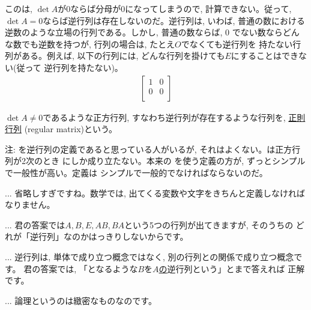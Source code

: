 このは, $\det A$が0ならば分母が0になってしまうので, 
計算できない。従って, $\det A=0$ならば逆行列は存在しないのだ。逆行列は, いわば, 
普通の数における逆数のような立場の行列である。しかし, 普通の数ならば, 0
でない数ならどんな数でも逆数を持つが, 行列の場合は, たとえ$O$でなくても逆行列を
持たない行列がある。例えば, 以下の行列には, どんな行列を掛けても$E$にすることはできない(従って
逆行列を持たない)。
\begin{eqnarray} \begin{bmatrix}
1 & 0 \\
0 & 0 \\
\end{bmatrix}\end{eqnarray}

$\det A \neq 0$であるような正方行列, すなわち逆行列が存在するような行列を, 
\underline{正則行列}  (regular matrix)という。

注: を逆行列の定義であると思っている人がいるが, 
それはよくない。は正方行列が2次のとき
にしか成り立たない。本来の
を使う定義の方が, ずっとシンプルで一般性が高い。定義は
シンプルで一般的でなければならないのだ。


\begin{faq}{\small{}
... 省略しすぎですね。数学では, 出てくる変数や文字をきちんと定義しなければなりません。}\end{faq}

\begin{faq}{\small{}
... 君の答案では$A, B, E, AB, BA$という5つの行列が出てきますが, そのうちの
どれが「逆行列」なのかはっきりしないからです。}\end{faq}

\begin{faq}{\small{}
... 逆行列は, 単体で成り立つ概念ではなく, 別の行列との関係で成り立つ概念です。
君の答案では, 「となるような$B$を\underline{$A$の}逆行列という」とまで答えれば
正解です。}\end{faq}

\begin{faq}{\small{}
... 論理というのは緻密なものなのです。}\end{faq}

